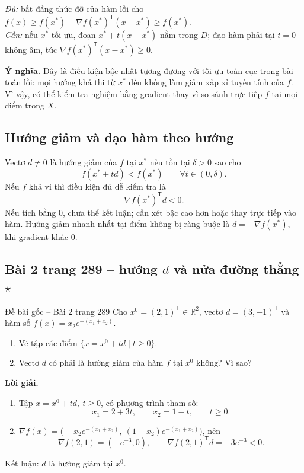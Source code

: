 \documentclass[11pt,a4paper]{article}
\newcommand{\R}{\mathbb{R}}
\newcommand{\grad}{\nabla}
\newcommand{\T}{^{\mathsf T}}
\begin{document}
\textit{Đủ:} bất đẳng thức đỡ của hàm lồi cho \(f(x)\ge f(x^\ast)+\grad f(x^\ast)\T(x-x^\ast)\ge f(x^\ast)\).\\
\textit{Cần:} nếu \(x^\ast\) tối ưu, đoạn \(x^\ast+t(x-x^\ast)\) nằm trong \(D\); đạo hàm phải tại \(t=0\) không âm, tức \(\grad f(x^\ast)\T(x-x^\ast)\ge0\).

\textbf{Ý nghĩa.} Đây là điều kiện bậc nhất tương đương với tối ưu toàn cục trong bài toán lồi: mọi hướng khả thi từ \(x^\ast\) đều không làm giảm xấp xỉ tuyến tính của \(f\). Vì vậy, có thể kiểm tra nghiệm bằng gradient thay vì so sánh trực tiếp \(f\) tại mọi điểm trong \(X\).

\subsection{Hướng giảm và đạo hàm theo hướng}
Vectơ \(d\ne0\) là hướng giảm của \(f\) tại \(x^\ast\) nếu tồn tại \(\delta>0\) sao cho
\[
f(x^\ast+td)<f(x^\ast)\qquad\forall t\in(0,\delta).
\]
Nếu \(f\) khả vi thì điều kiện đủ dễ kiểm tra là
\[
\grad f(x^\ast)\T d<0.
\]
Nếu tích bằng \(0\), chưa thể kết luận; cần xét bậc cao hơn hoặc thay trực tiếp vào hàm. Hướng giảm nhanh nhất tại điểm không bị ràng buộc là \(d=-\grad f(x^\ast)\), khi gradient khác \(0\).

\subsection{Bài 2 trang 289 -- hướng \(d\) và nửa đường thẳng \(\star\)}
\begin{questionbox}{Đề bài gốc -- Bài 2 trang 289}
Cho \(x^0=(2,1)\T\in\R^2\), vectơ \(d=(3,-1)\T\) và hàm số \(f(x)=x_2e^{-(x_1+x_2)}\).
\begin{enumerate}[label=\roman*),nosep,leftmargin=*]
\item Vẽ tập các điểm \(\{x=x^0+td\mid t\ge0\}\).
\item Vectơ \(d\) có phải là hướng giảm của hàm \(f\) tại \(x^0\) không? Vì sao?
\end{enumerate}
\end{questionbox}
\textbf{Lời giải.}
\begin{enumerate}[label=\roman*),nosep,leftmargin=*]
\item Tập \(x=x^0+td,\ t\ge0\), có phương trình tham số:
\[
x_1=2+3t,\qquad x_2=1-t,\qquad t\ge0.
\]
\item \(\grad f(x)=\big(-x_2e^{-(x_1+x_2)},\ (1-x_2)e^{-(x_1+x_2)}\big)\), nên
\[
\grad f(2,1)=(-e^{-3},0),\qquad \grad f(2,1)\T d=-3e^{-3}<0.
\]
\end{enumerate}
Kết luận: \(d\) là hướng giảm tại \(x^0\).
\end{document}
